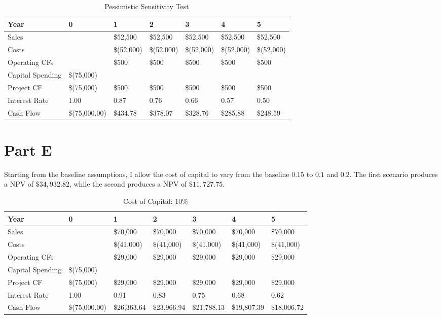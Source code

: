 \documentclass[12pt, letterpaper, parskip = full]{article}
\begin{document}
\begin{table}[!ht]
    \centering
    \caption{Pessimistic Sensitivity Test}
    \begin{tabularx}{\textwidth}{|X|X|X|X|X|X|X|}
    \hline
        Year & 0 & 1 & 2 & 3 & 4 & 5 \\ \hline
        Sales & ~ &  \$52,500  &  \$52,500  &  \$52,500  &  \$52,500  &  \$52,500  \\ \hline
        Costs & ~ &  \$(52,000) &  \$(52,000) &  \$(52,000) &  \$(52,000) &  \$(52,000) \\ \hline
        Operating CFs & ~ &  \$500  &  \$500  &  \$500  &  \$500  &  \$500  \\ \hline
        Capital Spending &  \$(75,000) & ~ & ~ & ~ & ~ & ~ \\ \hline
        Project CF &  \$(75,000) &  \$500  &  \$500  &  \$500  &  \$500  &  \$500  \\ \hline
        Interest Rate &  1.00  &  0.87  &  0.76  &  0.66  &  0.57  &  0.50  \\ \hline
        Cash Flow &  \$(75,000.00) &  \$434.78  &  \$378.07  &  \$328.76  &  \$285.88  &  \$248.59 \\ \hline
    \end{tabularx}
\end{table}

\section{Part E}

Starting from the baseline assumptions, I allow the cost of capital to vary from the baseline \(0.15\) to \(0.1\) and \(0.2\). The first scenario produces a NPV of \(\$34,932.82\), while the second produces a NPV of \(\$11,727.75\).

\begin{table}[!ht]
    \centering
    \caption{Cost of Capital: 10\%}
    \begin{tabularx}{\textwidth}{|X|X|X|X|X|X|X|}
    \hline
        Year & 0 & 1 & 2 & 3 & 4 & 5 \\ \hline
        Sales & ~ &  \$70,000  &  \$70,000  &  \$70,000  &  \$70,000  &  \$70,000  \\ \hline
        Costs & ~ &  \$(41,000) &  \$(41,000) &  \$(41,000) &  \$(41,000) &  \$(41,000) \\ \hline
        Operating CFs & ~ &  \$29,000  &  \$29,000  &  \$29,000  &  \$29,000  &  \$29,000  \\ \hline
        Capital Spending &  \$(75,000) & ~ & ~ & ~ & ~ & ~ \\ \hline
        Project CF &  \$(75,000) &  \$29,000  &  \$29,000  &  \$29,000  &  \$29,000  &  \$29,000  \\ \hline
        Interest Rate &  1.00  &  0.91  &  0.83  &  0.75  &  0.68  &  0.62  \\ \hline
        Cash Flow &  \$(75,000.00) &  \$26,363.64  &  \$23,966.94  &  \$21,788.13  &  \$19,807.39  &  \$18,006.72 \\ \hline
    \end{tabularx}
\end{table}
\end{document}
